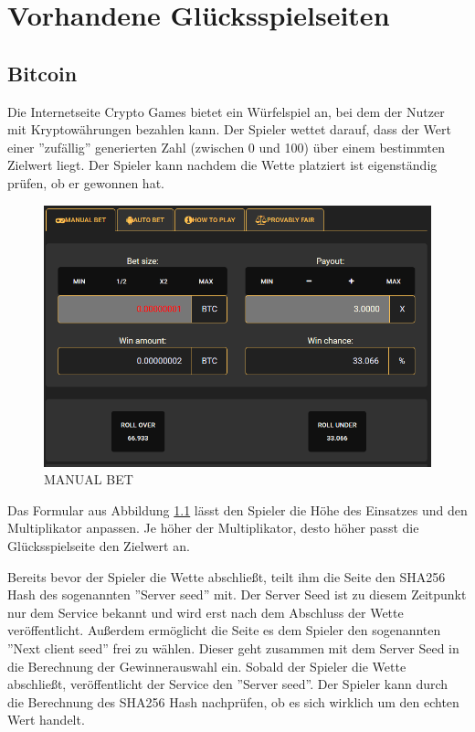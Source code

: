 \chapter{Vorhandene Glücksspielseiten}
\section{Bitcoin}
Die Internetseite Crypto Games \cite{crypto_games} bietet ein Würfelspiel an, bei dem der Nutzer mit Kryptowährungen bezahlen kann. Der Spieler wettet darauf, dass der Wert einer ''zufällig'' generierten Zahl (zwischen 0 und 100) über einem bestimmten Zielwert liegt. Der Spieler kann nachdem die Wette platziert ist eigenständig prüfen, ob er gewonnen hat.
\begin{figure}[H]
\centering
\includegraphics[scale=0.5]{Figures/crypto_games}
\decoRule
\caption{MANUAL BET}
\label{fig:crypto_games}
\end{figure}

Das Formular aus Abbildung \ref{fig:crypto_games} lässt den Spieler die Höhe des Einsatzes und den Multiplikator anpassen. Je höher der Multiplikator, desto höher passt die Glücks\-spiel\-seite den Zielwert an.

Bereits bevor der Spieler die Wette abschließt, teilt ihm die Seite den SHA256 Hash des sogenannten ''Server seed'' mit. Der Server Seed ist zu diesem Zeitpunkt nur dem Service bekannt und wird erst nach dem Abschluss der Wette veröffentlicht.
Außerdem ermöglicht die Seite es dem Spieler den sogenannten ''Next client seed'' frei zu wählen. Dieser geht zusammen mit dem Server Seed in die Berechnung der Gewinnerauswahl ein. Sobald der Spieler die Wette abschließt, veröffentlicht der Service den ''Server seed''. Der Spieler kann durch die Berechnung des SHA256 Hash nachprüfen, ob es sich wirklich um den echten Wert handelt.

